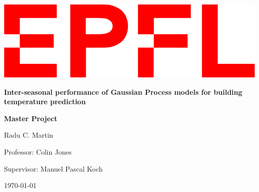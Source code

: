 \begin{titlepage}
\begin{center}

\includegraphics[width=0.5\linewidth]{Logo-EPFL.png}\par
\vspace{5cm}

{\Huge \bf Inter-seasonal performance of Gaussian Process models for building temperature prediction \par}
\vspace{1cm}
{\LARGE \bf Master Project\par}

\vspace{6cm}
{\Large Radu C. Martin}\par
\vspace{2cm}

{\large Professor: Colin Jones}\par
{\large Supervisor: Manuel Pascal Koch}\par

\vspace{0.5cm}
{\large\today}

\end{center}
\end{titlepage}
